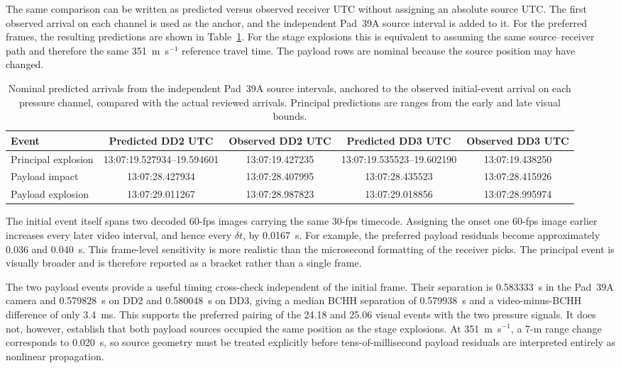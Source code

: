 \documentclass[]{seismica}
\begin{document}
The same comparison can be written as predicted versus observed receiver UTC
without assigning an absolute source UTC. The first observed arrival on each
channel is used as the anchor, and the independent Pad~39A source interval is
added to it. For the preferred frames, the resulting predictions are shown in
Table~\ref{tab:supp_predicted_arrivals}. For the stage explosions this is
equivalent to assuming the same source--receiver path and therefore the same
351~m~s$^{-1}$ reference travel time. The payload rows are nominal because the
source position may have changed.

\begin{table}[!tbp]
\centering
\caption{Nominal predicted arrivals from the independent Pad~39A source
intervals, anchored to the observed initial-event arrival on each pressure
channel, compared with the actual reviewed arrivals. Principal predictions are
ranges from the early and late visual bounds.}
\label{tab:supp_predicted_arrivals}
\begin{tabularx}{\textwidth}{Xcccc}
\hline
Event & Predicted DD2 UTC & Observed DD2 UTC & Predicted DD3 UTC & Observed DD3 UTC \\
\hline
Principal explosion & 13:07:19.527934--19.594601 & 13:07:19.427235 & 13:07:19.535523--19.602190 & 13:07:19.438250 \\
Payload impact & 13:07:28.427934 & 13:07:28.407995 & 13:07:28.435523 & 13:07:28.415926 \\
Payload explosion & 13:07:29.011267 & 13:07:28.987823 & 13:07:29.018856 & 13:07:28.995974 \\
\hline
\end{tabularx}
\end{table}

The initial event itself spans two decoded 60-fps images carrying the same
30-fps timecode. Assigning the onset one 60-fps image earlier increases every
later video interval, and hence every $\delta t$, by 0.0167~s. For example,
the preferred payload residuals become approximately 0.036 and 0.040~s. This
frame-level sensitivity is more realistic than the microsecond formatting of
the receiver picks. The principal event is visually broader and is therefore
reported as a bracket rather than a single frame.

The two payload events provide a useful timing cross-check independent of the
initial frame. Their separation is 0.583333~s in the Pad~39A camera and
0.579828~s on DD2 and 0.580048~s on DD3, giving a median BCHH separation of
0.579938~s and a video-minus-BCHH difference of only 3.4~ms. This supports the
preferred pairing of the 24.18 and 25.06 visual events with the two pressure
signals. It does not, however, establish that both payload sources occupied the
same position as the stage explosions. At 351~m~s$^{-1}$, a 7-m range change
corresponds to 0.020~s, so source geometry must be treated explicitly before
tens-of-millisecond payload residuals are interpreted entirely as nonlinear
propagation.
\end{document}
